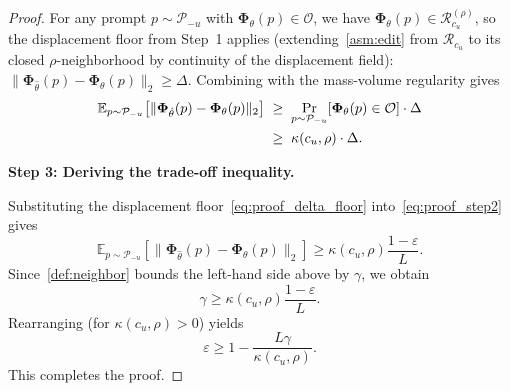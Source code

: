 \begin{proof}
For any prompt $p\sim\mathcal{P}_{-u}$ with $\boldsymbol{\Phi}_\theta(p)\in\mathcal{O}$, we have $\boldsymbol{\Phi}_\theta(p)\in\mathcal{R}_{c_u}^{(\rho)}$, so the displacement floor from Step~1 applies (extending~\cref{asm:edit} from $\mathcal{R}_{c_u}$ to its closed $\rho$-neighborhood by continuity of the displacement field): $\|\boldsymbol{\Phi}_{\hat\theta}(p)-\boldsymbol{\Phi}_\theta(p)\|_2 \geq \Delta$. Combining with the mass-volume regularity gives
\begin{align}
    \mathbb{E}_{p\sim \mathcal{P}_{-u}}
    \!\left[\|\boldsymbol{\Phi}_{\hat{\theta}}(p)-\boldsymbol{\Phi}_{\theta}(p)\|_2\right]
    &\;\geq\; \Pr_{p\sim\mathcal{P}_{-u}}\!\left[\boldsymbol{\Phi}_\theta(p)\in\mathcal{O}\right]\cdot\Delta \notag\\
    &\;\geq\; \kappa(c_u,\rho)\cdot\Delta. \label{eq:proof_step2}
\end{align}

\medskip
\noindent\textbf{Step 3: Deriving the trade-off inequality.}

Substituting the displacement floor~\eqref{eq:proof_delta_floor} into~\eqref{eq:proof_step2} gives
\begin{equation}
    \mathbb{E}_{p\sim \mathcal{P}_{-u}}
    \left[
    \|\boldsymbol{\Phi}_{\hat{\theta}}(p)-\boldsymbol{\Phi}_{\theta}(p)\|_2
    \right]
    \geq
    \kappa(c_u,\rho)\frac{1-\varepsilon}{L}.
\end{equation}
Since~\cref{def:neighbor} bounds the left-hand side above by $\gamma$, we obtain
\begin{equation}
    \gamma
    \geq
    \kappa(c_u,\rho)\frac{1-\varepsilon}{L}.
\end{equation}
Rearranging (for $\kappa(c_u,\rho) > 0$) yields
\begin{equation}
    \varepsilon
    \geq
    1-\frac{L\gamma}{\kappa(c_u,\rho)}.
\end{equation}
This completes the proof.
\end{proof}



